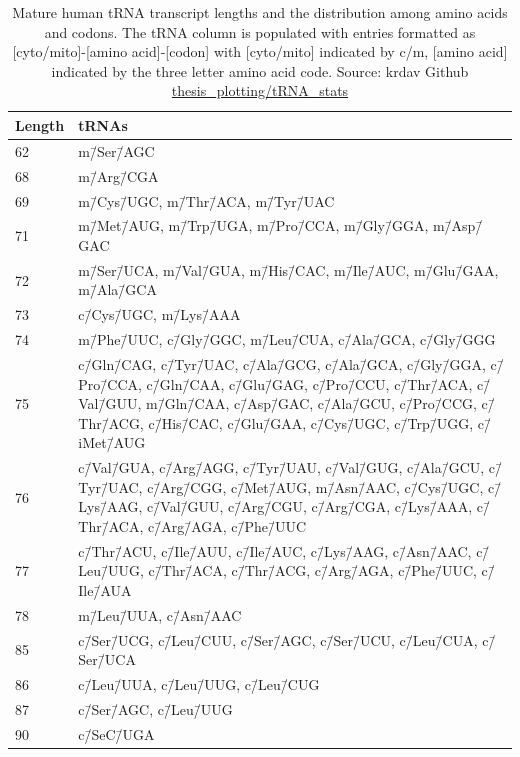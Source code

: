 \begin{table}[!htb]
\begin{tabular}{|l|p{}|}
\hline
Length & tRNAs \\ \hline
62     & m\=/Ser\=/AGC \\ \hline
68     & m\=/Arg\=/CGA \\ \hline
69     & m\=/Cys\=/UGC, m\=/Thr\=/ACA, m\=/Tyr\=/UAC \\ \hline
71     & m\=/Met\=/AUG, m\=/Trp\=/UGA, m\=/Pro\=/CCA, m\=/Gly\=/GGA, m\=/Asp\=/GAC \\ \hline
72     & m\=/Ser\=/UCA, m\=/Val\=/GUA, m\=/His\=/CAC, m\=/Ile\=/AUC, m\=/Glu\=/GAA, m\=/Ala\=/GCA \\ \hline
73     & c\=/Cys\=/UGC, m\=/Lys\=/AAA \\ \hline
74     & m\=/Phe\=/UUC, c\=/Gly\=/GGC, m\=/Leu\=/CUA, c\=/Ala\=/GCA, c\=/Gly\=/GGG \\ \hline
75     & c\=/Gln\=/CAG, c\=/Tyr\=/UAC, c\=/Ala\=/GCG, c\=/Ala\=/GCA, c\=/Gly\=/GGA, c\=/Pro\=/CCA,   c\=/Gln\=/CAA, c\=/Glu\=/GAG, c\=/Pro\=/CCU, c\=/Thr\=/ACA, c\=/Val\=/GUU, m\=/Gln\=/CAA, c\=/Asp\=/GAC,   c\=/Ala\=/GCU, c\=/Pro\=/CCG, c\=/Thr\=/ACG, c\=/His\=/CAC, c\=/Glu\=/GAA, c\=/Cys\=/UGC, c\=/Trp\=/UGG,   c\=/iMet\=/AUG \\ \hline
76     & c\=/Val\=/GUA, c\=/Arg\=/AGG, c\=/Tyr\=/UAU, c\=/Val\=/GUG, c\=/Ala\=/GCU, c\=/Tyr\=/UAC,   c\=/Arg\=/CGG, c\=/Met\=/AUG, m\=/Asn\=/AAC, c\=/Cys\=/UGC, c\=/Lys\=/AAG, c\=/Val\=/GUU, c\=/Arg\=/CGU,   c\=/Arg\=/CGA, c\=/Lys\=/AAA, c\=/Thr\=/ACA, c\=/Arg\=/AGA, c\=/Phe\=/UUC \\ \hline
77     & c\=/Thr\=/ACU, c\=/Ile\=/AUU, c\=/Ile\=/AUC, c\=/Lys\=/AAG, c\=/Asn\=/AAC, c\=/Leu\=/UUG,   c\=/Thr\=/ACA, c\=/Thr\=/ACG, c\=/Arg\=/AGA, c\=/Phe\=/UUC, c\=/Ile\=/AUA \\ \hline
78     & m\=/Leu\=/UUA, c\=/Asn\=/AAC \\ \hline
85     & c\=/Ser\=/UCG, c\=/Leu\=/CUU, c\=/Ser\=/AGC, c\=/Ser\=/UCU, c\=/Leu\=/CUA, c\=/Ser\=/UCA \\ \hline
86     & c\=/Leu\=/UUA, c\=/Leu\=/UUG, c\=/Leu\=/CUG \\ \hline
87     & c\=/Ser\=/AGC, c\=/Leu\=/UUG \\ \hline
90     & c\=/SeC\=/UGA \\ \hline
\end{tabular}
\caption[Length distribution of tRNAs]{Mature human tRNA transcript lengths and the distribution among amino acids and codons. The tRNA column is populated with entries formatted as [cyto/mito]-[amino acid]-[codon] with [cyto/mito] indicated by c/m, [amino acid] indicated by the three letter amino acid code. Source: krdav Github \href{https://github.com/krdav/thesis_plotting/blob/main/tRNA_stats/plot_data.ipynb}{thesis\_plotting/tRNA\_stats}}
\end{table}
















